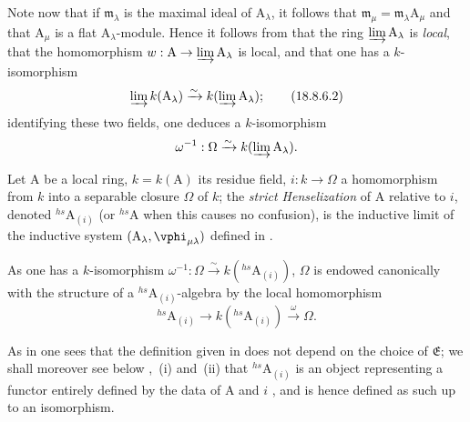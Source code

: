 \begin{env}[18.8.6]
Note now that if $\mathfrak{m}_\lambda$ is the maximal ideal of $\mathrm{A}_\lambda$, it follows that $\mathfrak{m}_\mu=\mathfrak{m}_\lambda\mathrm{A}_\mu$ and that $\mathrm{A}_\mu$ is a flat $\mathrm{A}_\lambda$-module.
Hence it follows from  that the ring $\varinjlim\mathrm{A}_\lambda$ is \emph{local}, that the homomorphism $w:\mathrm{A}\to\varinjlim\mathrm{A}_\lambda$ is local, and that one has a $k$-isomorphism
\begin{equation}
  \varinjlim k(\mathrm{A}_\lambda)\xrightarrow{\sim}k(\varinjlim\mathrm{A}_\lambda);
  \tag{18.8.6.2}
\end{equation}
identifying these two fields, one deduces a $k$-isomorphism
\[
  \omega^{-1}:\Omega\xrightarrow{\sim}k(\varinjlim\mathrm{A}_\lambda).
\]
\end{env}

\begin{definition}[18.8.7]
\label{IV.18.8.7}
Let $\mathrm{A}$ be a local ring, $k=k(\mathrm{A})$ its residue field, $i:k\to\Omega$ a homomorphism from $k$ into a separable closure $\Omega$ of $k$;
the \emph{strict Henselization} of $\mathrm{A}$ relative to $i$, denoted ${}^{hs}\!\mathrm{A}_{(i)}$ (or ${}^{hs}\!\mathrm{A}$ when this causes no confusion), is the inductive limit of the inductive system $(\mathrm{A}_\lambda,\vphi_{\mu\lambda})$ defined in .
\end{definition}

As one has a $k$-isomorphism $\omega^{-1}:\Omega\xrightarrow{\sim}k({}^{hs}\!\mathrm{A}_{(i)})$, $\Omega$ is endowed canonically with the structure of a ${}^{hs}\!\mathrm{A}_{(i)}$-algebra by the local homomorphism
\[
  {}^{hs}\!\mathrm{A}_{(i)}\to k({}^{hs}\!\mathrm{A}_{(i)})\xrightarrow{\omega}\Omega.
\]

As in  one sees that the definition given in  does not depend on the choice of $\mathfrak{E}$;
we shall moreover see below ,~(i) and~(ii) that ${}^{hs}\!\mathrm{A}_{(i)}$ is an object representing a functor entirely defined by the data of A and $i$ , and is hence defined as such up to an isomorphism.

